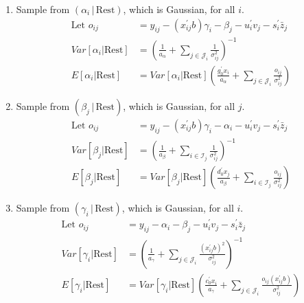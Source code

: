 \begin{enumerate}
\item Sample from $(\alpha_i \,|\, \textrm{Rest})$, which is Gaussian, for all $i$.
\begin{equation}
\begin{split}
\mbox{Let } o_{ij} & = y_{ij} - (x_{ij}^{\prime} b)\gamma_i - \beta_j - 
	u_i^\prime v_j - s_{i}^{\prime} \bar{z}_j \\
\textit{Var}[\alpha_i|\mbox{Rest}] & = 
	( \frac{1}{a_{\alpha}} + 
		\sum_{j \in \mathcal{J}_i} \frac{1}{\sigma_{ij}^{2}} )^{-1} \\
E[\alpha_i|\mbox{Rest}] & = 
	\textit{Var}[\alpha_i|\mbox{Rest}]
	( \frac{g_0^{\prime} x_i}{a_{\alpha}} + 
		 \sum_{j \in \mathcal{J}_i} \frac{o_{ij}}{\sigma_{ij}^{2}} )
\end{split}
\end{equation}

\item Sample from $(\beta_j \,|\, \textrm{Rest})$, which is Gaussian, for all $j$.
\begin{equation}
\begin{split}
\mbox{Let } o_{ij} & = y_{ij} - (x_{ij}^{\prime} b) \gamma_i - \alpha_i - 
	u_i^\prime v_j - s_{i}^{\prime} \bar{z}_j \\
\textit{Var}[\beta_j|\mbox{Rest}] & = 
	( \frac{1}{a_{\beta}} + 
		\sum_{i \in \mathcal{I}_j} \frac{1}{\sigma_{ij}^{2}} )^{-1} \\
E[\beta_j|\mbox{Rest}] & =  
	\textit{Var}[\beta_j|\mbox{Rest}]
	( \frac{d_0^{\prime} x_j}{a_{\beta}} + 
		 \sum_{i \in \mathcal{I}_j} \frac{o_{ij}}{\sigma_{ij}^{2}} )
\end{split}
\end{equation}

\item Sample from $(\gamma_i \,|\, \textrm{Rest})$, which is Gaussian, for all $i$.
\begin{equation}
\begin{split}
\mbox{Let } o_{ij} & =  y_{ij} - \alpha_i - \beta_j - u_i^\prime v_j -
	s_i^\prime \bar{z}_j \\
\textit{Var}[\gamma_i|\mbox{Rest}] & =  
	( \frac{1}{a_{\gamma}} + 
	  \sum_{j \in \mathcal{J}_i} 
			\frac{(x_{ij}^{\prime} b)^2}{\sigma_{ij}^{2}} 
	)^{-1} \\
E[\gamma_i|\mbox{Rest}] & = 
	\textit{Var}[\gamma_i|\mbox{Rest}]
	( \frac{ c_0^\prime x_i }{a_{\gamma}} + 
		 \sum_{j \in \mathcal{J}_i} 
			\frac{o_{ij} (x_{ij}^{\prime} b)}{\sigma_{ij}^{2}} )
\end{split}
\end{equation}


\end{enumerate}

